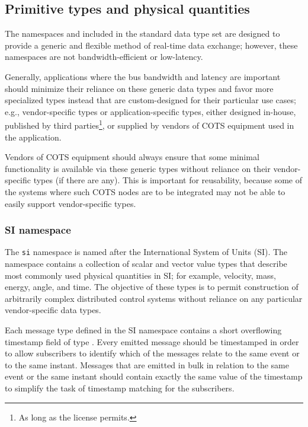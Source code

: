 \subsection{Primitive types and physical quantities}

The namespaces  and 
included in the standard data type set are designed to provide a generic and flexible
method of real-time data exchange; however, these namespaces are not bandwidth-efficient
or low-latency.

Generally, applications where the bus bandwidth and latency are important should minimize their reliance
on these generic data types and favor more specialized types instead that are custom-designed for their
particular use cases; e.g., vendor-specific types or application-specific types, either
designed in-house, published by third parties\footnote{As long as the license permits.}, or supplied by
vendors of COTS equipment used in the application.

Vendors of COTS equipment should always ensure that some minimal functionality is available
via these generic types without reliance on their vendor-specific types (if there are any).
This is important for reusability, because some of the systems where such COTS nodes are
to be integrated may not be able to easily support vendor-specific types.

\subsubsection{SI namespace}

The \verb|si| namespace is named after the International System of Units (SI).
The namespace contains a collection of scalar and vector value types that describe most commonly used
physical quantities in SI; for example, velocity, mass, energy, angle, and time.
The objective of these types is to permit construction of arbitrarily complex distributed control systems without
reliance on any particular vendor-specific data types.

Each message type defined in the SI namespace contains a short overflowing timestamp field of type
.
Every emitted message should be timestamped in order to allow subscribers to identify which of the messages
relate to the same event or to the same instant.
Messages that are emitted in bulk in relation to the same event or the same instant should contain
exactly the same value of the timestamp
to simplify the task of timestamp matching for the subscribers.


